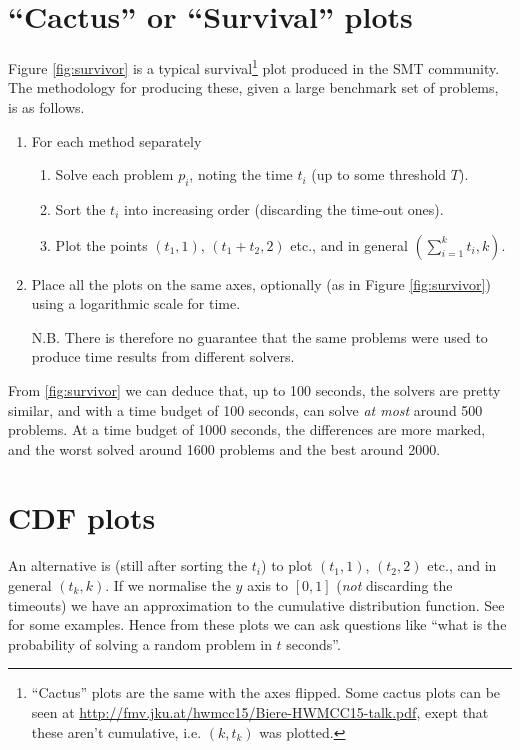 \section{``Cactus'' or ``Survival'' plots}
Figure \ref{fig:survivor} is a typical survival\footnote{``Cactus'' plots are the same with the axes flipped. Some cactus plots can be seen at \url{http://fmv.jku.at/hwmcc15/Biere-HWMCC15-talk.pdf}, exept that these aren't cumulative, i.e. $(k,t_k)$ was plotted.} plot produced in the SMT community.
The methodology for producing these, given a large benchmark set of problems, is as follows.
\begin{enumerate}
\item For each method separately
\begin{enumerate}
\item Solve each problem $p_i$, noting the time $t_i$ (up to some threshold $T$).
\item Sort the $t_i$ into increasing order (discarding the time-out ones).
\item Plot the points $(t_1,1)$, $(t_1+t_2,2)$ etc., and in general $(\sum_{i=1}^kt_i,k)$.
\end{enumerate}
\item Place all the plots on the same axes, optionally (as in Figure \ref{fig:survivor}) using a logarithmic scale for time.
\item[N.B.]There is therefore no guarantee that the same problems were used to produce time results from different solvers.
\end{enumerate}
From \ref{fig:survivor} we can deduce that, up to 100 seconds, the solvers are pretty similar, and with a time budget of 100 seconds, can solve \emph{at most} around 500 problems. At a time budget of 1000 seconds, the differences are more marked, and the worst solved around 1600 problems and the best around 2000.
\section{CDF plots}
An alternative is (still after sorting the $t_i$) to plot  $(t_1,1)$, $(t_2,2)$ etc., and in general $(t_k,k)$. If we normalise the $y$ axis to $[0,1]$ (\emph{not} discarding the timeouts) we have an approximation to the cumulative distribution function. See \cite{Xuetal2008b} for some examples. Hence from these plots we can ask questions like ``what is the probability of solving a random problem in $t$ seconds''.
